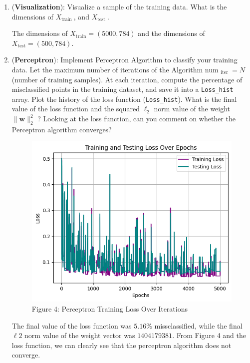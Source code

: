 \documentclass[letterpaper]{article}
\theoremstyle{definition}
\begin{document}
\begin{enumerate}
\begin{enumerate}
\item (\textbf{Visualization}): Visualize a sample of the training data. What is the dimensions of \(X_{\text {train }}\), and \(X_{\text {test }}\).

\color{teal}
The dimensions of \(X_{\text{train}} = (5000, 784)\) and the dimensions of \(X_{\text{test}} = (500, 784)\).
\color{black}

\item (\textbf{Perceptron}): Implement Perceptron Algorithm to classify your training data.
Let the maximum number of iterations of the Algorithm num \(_{\text {iter }}=N\) (number of training samples).
At each iteration, compute the percentage of misclassified points in the training dataset,
and save it into a \texttt{Loss\_hist} array. Plot the history of the loss function (\texttt{Loss\_hist}).
What is the final value of the loss function and the squared \(\ell_{2}\) norm value of the weight \(\|\mathbf{w}\|_{2}^{2}\) ? Looking at the loss function, can you comment on whether the Perceptron algorithm converges?

\color{teal}
\begin{figure}[htbp]
\centering
\includegraphics[width=400]{../assets/hw1_fig4.png}
\caption{Figure 4: Perceptron Training Loss Over Iterations}
\end{figure}
The final value of the loss function was \(5.16\%\) missclassified, while the final \(\ell 2\) norm
value of the weight vector was \(1404179381\). From Figure 4 and the loss function, we can
clearly see that the perceptron algorithm does not converge.
\color{black}


\end{enumerate}
\end{enumerate}
\end{document}
